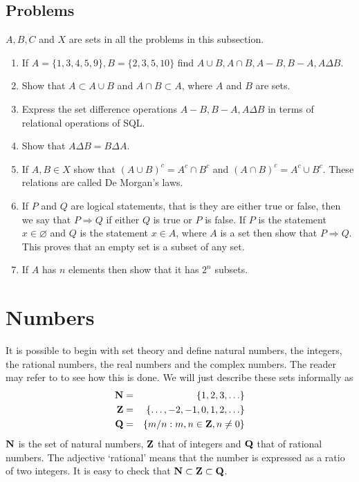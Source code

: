 \subsection{Problems}
$A, B, C$ and $X$ are sets in all the problems in this subsection.
\begin{enumerate}
\item If $A = \{1, 3, 4, 5, 9\}, B = \{2, 3, 5, 10\}$ find $A \cup B, A \cap B,
A - B, B - A, A \Delta B$.
\item Show that $A \subset A \cup B$ and $A \cap B \subset A$, where $A$ and $B$ are
sets.
\item Express the set difference operations $A - B, B - A, A \Delta B$ in terms of
relational operations of SQL.
\item Show that $A \Delta B = B \Delta A$.
\item If $A, B \in X$ show that $(A \cup B)^c = A^c \cap B^c$ and $(A \cap B)^c 
= A^c \cup B^c$. These relations are called De Morgan's laws.
\item If $P$ and $Q$ are logical statements, that is they are either true or false, 
then we say that $P \Rightarrow Q$ if either $Q$ is true or $P$ is false. If $P$ is
the statement $x \in \varnothing$ and $Q$ is the statement $x \in A$, where $A$ is 
a set then show that $P \Rightarrow Q$. This proves that an empty set is a subset 
of any set.
\item If $A$ has $n$ elements then show that it has $2^n$ subsets.
\end{enumerate}

\section{Numbers}\label{c1s2}
It is possible to begin with set theory and define natural numbers, the integers,
the rational numbers, the real numbers and the complex numbers. The reader may
refer to \cite{tao2009analysis} to see how this is done. We will just describe these
sets informally as
\begin{eqnarray}
\mathbf{N} &=& \{1, 2, 3, \ldots\} \label{c1s2e1} \\
\mathbf{Z} &=& \{\ldots, -2, -1, 0, 1, 2, \ldots\} \label{c1s2e2} \\
\mathbf{Q} &=& \{m/n : m, n \in \mathbf{Z}, n \ne 0\} \label{c1s2e3} 
\end{eqnarray}
$\mathbf{N}$ is the set of natural numbers, $\mathbf{Z}$ that of integers and $\mathbf{Q}$ that of
rational numbers. The adjective `rational' means that the number is expressed as 
a ratio of two integers. It is easy to check that $\mathbf{N} \subset \mathbf{Z} \subset \mathbf{Q}$. 

